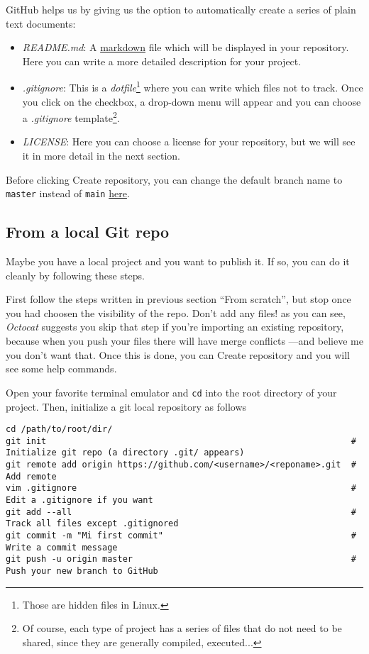 \textsf{GitHub} helps us by giving us the option to automatically create a series of plain text documents:
\begin{itemize}
    \item \textit{README.md}: A \href{https://www.markdownguide.org/getting-started/}{markdown} file which will be displayed in your repository. Here you can write a more detailed description for your project.
    \item \textit{.gitignore}: This is a \textit{dotfile}\footnote{Those are hidden files in \textsf{Linux}.} where you can write which files not to track. Once you click on the checkbox, a drop-down menu will appear and you can choose a \textit{.gitignore} template\footnote{Of course, each type of project has a series of files that do not need to be shared, since they are generally compiled, executed...}.
    \item \textit{LICENSE}: Here you can choose a license for your repository, but we will see it in more detail in the next section.
\end{itemize}

Before clicking \textsf{Create repository}, you can change the default branch name to \texttt{master} instead of \texttt{main} \href{https://github.com/settings/repositories}{here}.

\subsection{From a local \textsf{Git} repo}

Maybe you have a local project and you want to publish it. If so, you can do it cleanly by following these steps.

First follow the steps written in previous section ``From scratch'', but stop once you had choosen the visibility of the repo. Don't add any files! as you can see, \textit{Octocat} suggests you skip that step if you're importing an existing repository, because when you push your files there will have merge conflicts ---and believe me you don't want that. Once this is done, you can \textsf{Create repository} and you will see some help commands.

Open your favorite terminal emulator and \texttt{cd} into the root directory of your project. Then, initialize a git local repository as follows

\begin{lstlisting}[style=shell]
cd /path/to/root/dir/
git init                                                            # Initialize git repo (a directory .git/ appears)
git remote add origin https://github.com/<username>/<reponame>.git  # Add remote
vim .gitignore                                                      # Edit a .gitignore if you want
git add --all                                                       # Track all files except .gitignored
git commit -m "Mi first commit"                                     # Write a commit message 
git push -u origin master                                           # Push your new branch to GitHub
\end{lstlisting}


